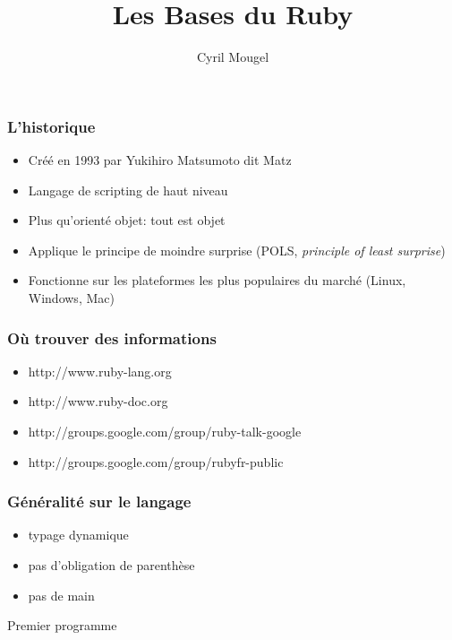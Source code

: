 \documentclass{beamer}
\title{Les Bases du Ruby}
\author{Cyril Mougel}
\begin{document}
\begin{frame}
  \titlepage
\end{frame}

\Large{}

\begin{frame}
	\frametitle{L'historique}
	\begin{itemize}
		\item Créé en 1993 par Yukihiro Matsumoto dit \og{}Matz\fg{}
		\item Langage de scripting de haut niveau
		\item Plus qu'orienté objet: tout est objet
        \item Applique le principe de moindre surprise (POLS, \emph{principle of
                least surprise})
        \item Fonctionne sur les plateformes les plus populaires du marché (Linux, Windows,
                Mac)
	\end{itemize}
\end{frame}

\begin{frame}
  \frametitle{Où trouver des informations}
  \begin{itemize}
    \item http://www.ruby-lang.org
    \item http://www.ruby-doc.org
    \item http://groups.google.com/group/ruby-talk-google
    \item http://groups.google.com/group/rubyfr-public
  \end{itemize}
\end{frame}

\begin{frame}
  \frametitle{G\'en\'eralit\'e sur le langage}
  \begin{itemize}
    \item typage dynamique
    \item pas d'obligation de parenthèse
    \item pas de main
  \end{itemize}
\end{frame}

\begin{frame}
  \begin{beamerboxesrounded}{Premier programme}
    
  \end{beamerboxesrounded}
\end{frame}
\end{document}
